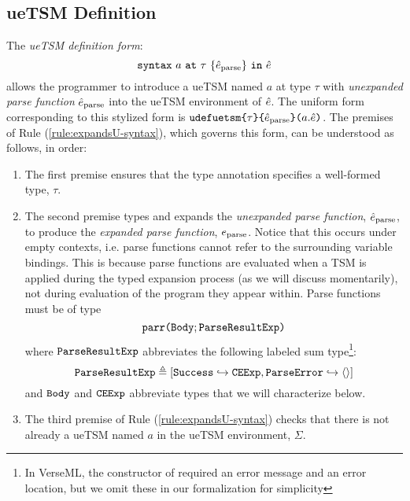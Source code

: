 \subsection{ueTSM Definition}\label{sec:U-uetsm-definition}
The \emph{ueTSM definition form}: $$\texttt{syntax}~a~\texttt{at}~\tau~\{\hat{e}_\text{parse}\}~\texttt{in}~\hat{e}$$ allows the programmer to introduce a {ueTSM} named $a$ at type $\tau$ with \emph{unexpanded parse function} $\hat{e}_\text{parse}$ into the ueTSM environment of $\hat{e}$. The uniform form corresponding to this stylized form is $\texttt{udefuetsm}\texttt{\{}\tau\texttt{\}\{}\hat{e}_\text{parse}\texttt{\}(}a.\hat{e}\texttt{)}$. 
The premises of Rule (\ref{rule:expandsU-syntax}), which governs this form, can be understood as follows, in order:
\begin{enumerate}
\item The first premise ensures that the type annotation specifies a well-formed type, $\tau$.
\item The second premise types and expands the \emph{unexpanded parse function}, $\hat{e}_\text{parse}$, to produce the \emph{expanded parse function}, $e_\text{parse}$. Notice that this occurs under empty contexts, i.e. parse functions cannot refer to the surrounding variable bindings. This is because parse functions are evaluated when a TSM is applied during the typed expansion process (as we will discuss momentarily), not during evaluation of the program they appear within. Parse functions must be of type \[\texttt{parr}\texttt{(}\mathtt{Body}; \mathtt{ParseResultExp}\texttt{)}\] where 
$\mathtt{ParseResultExp}$ abbreviates the following labeled sum type\footnote{In VerseML, the  constructor of  required an error message and an error location, but we omit these in our formalization for simplicity}:
\[
\mathtt{ParseResultExp} \triangleq [\mathtt{Success} \hookrightarrow \mathtt{CEExp}, \mathtt{ParseError} \hookrightarrow \langle  \rangle]
\] and 
 $\mathtt{Body}$ and $\mathtt{CEExp}$ abbreviate types that we will characterize below. 
\item The third premise of Rule (\ref{rule:expandsU-syntax}) checks that there is not already a ueTSM named $a$ in the ueTSM environment, $\Sigma$. 


\end{enumerate}
